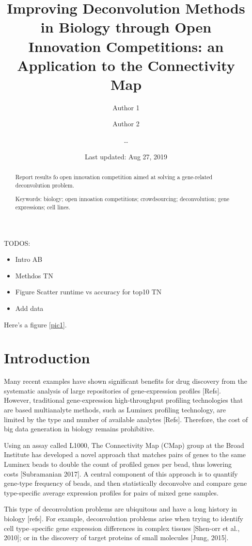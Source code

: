 \documentclass[]{article}
\title{Improving Deconvolution Methods in Biology through Open Innovation
Competitions: an Application to the Connectivity Map}
\author{Author 1 \and Author 2 \and \ldots{}}
\date{Last updated: Aug 27, 2019}
\providecommand{\tightlist}{%
  \setlength{\itemsep}{0pt}\setlength{\parskip}{0pt}}
\begin{document}
\maketitle
\begin{abstract}
Report results fo open innovation competition aimed at solving a
gene-related deconvolution problem.


\smallskip\noindent 
Keywords: biology; open innoation competitions; crowdsourcing; deconvolution; gene expressions; cell lines.
\end{abstract}

{
\setcounter{tocdepth}{2}
\newpage
\tableofcontents
\newpage
}
TODOS:

\begin{itemize}
\tightlist
\item
  Intro AB
\item
  Methdos TN
\item
  Figure Scatter runtime vs accuracy for top10 TN
\item
  Add data
\end{itemize}

Here's a figure \ref{pic1}.

\hypertarget{introduction}{%
\section{Introduction}\label{introduction}}

Many recent examples have shown significant benefits for drug discovery
from the systematic analysis of large repositories of gene-expression
profiles {[}Refs{]}. However, traditional gene-expression
high-throughput profiling technologies that are based multianalyte
methods, such as Luminex profiling technology, are limited by the type
and number of available analytes {[}Refs{]}. Therefore, the cost of big
data generation in biology remains prohibitive.

Using an assay called L1000, The Connectivity Map (CMap) group at the
Broad Institute has developed a novel approach that matches pairs of
genes to the same Luminex beads to double the count of profiled genes
per bead, thus lowering costs {[}Subramanian 2017{]}. A central
component of this approach is to quantify gene-type frequency of beads,
and then statistically deconvolve and compare gene type-specific average
expression profiles for pairs of mixed gene samples.

This type of deconvolution problems are ubiquitous and have a long
history in biology {[}refs{]}. For example, deconvolution problems arise
when trying to identify cell type--specific gene expression differences
in complex tissues {[}Shen-orr et al., 2010{]}; or in the discovery of
target proteins of small molecules {[}Jung, 2015{]}.
\end{document}
